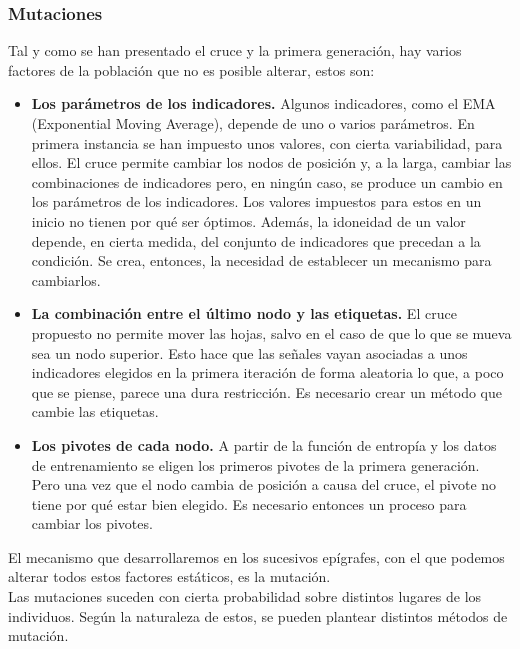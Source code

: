 \subsubsection{Mutaciones}
Tal y como se han presentado el cruce y la primera generaci\'on, hay varios factores de la poblaci\'on que no es posible alterar, estos son:\\

\begin{itemize}
    \item \textbf{Los par\'ametros de los indicadores.} Algunos indicadores, como el EMA (Exponential Moving Average), depende de uno o varios par\'ametros. En primera instancia se han impuesto unos valores, con cierta variabilidad, para ellos. El cruce permite cambiar los nodos de posici\'on y, a la larga, cambiar las combinaciones de indicadores pero, en ning\'un caso, se produce un cambio en los par\'ametros de los indicadores. Los valores impuestos para estos en un inicio no tienen por qu\'e ser \'optimos. Adem\'as, la idoneidad de un valor depende, en cierta medida, del conjunto de indicadores que precedan a la condici\'on. Se crea, entonces, la necesidad de establecer un mecanismo para cambiarlos.
    \item \textbf{La combinaci\'on entre el \'ultimo nodo y las etiquetas.} El cruce propuesto no permite mover las hojas, salvo en el caso de que lo que se mueva sea un nodo superior. Esto hace que las se\~nales vayan asociadas a unos indicadores elegidos en la primera iteraci\'on de forma aleatoria lo que, a poco que se piense, parece una dura restricci\'on. Es necesario crear un m\'etodo que cambie las etiquetas. 
    \item \textbf{Los pivotes de cada nodo.} A partir de la funci\'on de entrop\'ia y los datos de entrenamiento se eligen los primeros pivotes de la primera generaci\'on. Pero una vez que el nodo cambia de posici\'on a causa del cruce, el pivote no tiene por qu\'e estar bien elegido. Es necesario entonces un proceso para cambiar los pivotes.
\end{itemize}

 El mecanismo que desarrollaremos en los sucesivos ep\'igrafes, con el que podemos alterar todos estos factores est\'aticos, es la mutaci\'on.\\
 
 Las mutaciones suceden con cierta probabilidad sobre distintos lugares de los individuos. Seg\'un la naturaleza de estos, se pueden plantear distintos m\'etodos de mutaci\'on.\\
 
